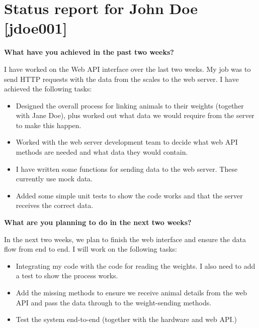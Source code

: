 \documentclass[11pt,a4paper]{article}
\newcommand{\name}{John Doe}
\newcommand{\upi}{jdoe001}
\begin{document}
\section*{Status report for \name{} [\upi]}

\textbf{What have you achieved in the past two weeks?}

I have worked on the Web API interface over the last two weeks. My job was to send HTTP requests with the data from the scales to the web server. I have achieved the following tasks:

\begin{itemize}

\item Designed the overall process for linking animals to their weights (together with Jane Doe), plus worked out what data we would require from the server to make this happen.

\item Worked with the web server development team to decide what web API methods are needed and what data they would contain.

\item I have written some functions for sending data to the web server. These currently use mock data.

\item Added some simple unit tests to show the code works and that the server receives the correct data.

\end{itemize}

\textbf{What are you planning to do in the next two weeks?}

In the next two weeks, we plan to finish the web interface and ensure the data flow from end to end. I will work on the following tasks:

\begin{itemize}
\item Integrating my code with the code for reading the weights. I also need to add a test to show the process works.

\item Add the missing methods to ensure we receive animal details from the web API and pass the data through to the weight-sending methods.

\item Test the system end-to-end (together with the hardware and web API.)


\end{itemize}
\end{document}
